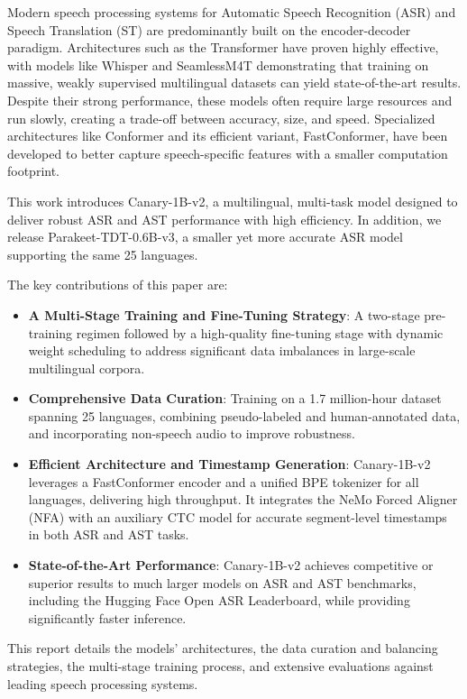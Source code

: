 


Modern speech processing systems for Automatic Speech Recognition (ASR) and Speech Translation (ST) are predominantly built on the encoder-decoder paradigm. Architectures such as the Transformer\cite{attention} have proven highly effective, with models like Whisper\cite{radford2023whisper} and SeamlessM4T\cite{barrault2023seamlessm4t} demonstrating that training on massive, weakly supervised multilingual datasets can yield state-of-the-art results. Despite their strong performance, these models often require large resources and run slowly, creating a trade-off between accuracy, size, and speed. Specialized architectures like Conformer and its efficient variant, FastConformer, have been developed to better capture speech-specific features with a smaller computation footprint.

This work introduces Canary-1B-v2, a multilingual, multi-task model designed to deliver robust ASR and AST performance with high efficiency. In addition, we release Parakeet-TDT-0.6B-v3, a smaller yet more accurate ASR model supporting the same 25 languages.

The key contributions of this paper are:

\begin{itemize}
\item \textbf{A Multi-Stage Training and Fine-Tuning Strategy}: A two-stage pre-training regimen followed by a high-quality fine-tuning stage with dynamic weight scheduling to address significant data imbalances in large-scale multilingual corpora.

\item \textbf{Comprehensive Data Curation}: Training on a 1.7 million-hour dataset spanning 25 languages, combining pseudo-labeled and human-annotated data, and incorporating non-speech audio to improve robustness.

\item \textbf{Efficient Architecture and Timestamp Generation}: Canary-1B-v2 leverages a FastConformer encoder and a unified BPE tokenizer for all languages, delivering high throughput. It integrates the NeMo Forced Aligner (NFA) with an auxiliary CTC model for accurate segment-level timestamps in both ASR and AST tasks.

\item \textbf{State-of-the-Art Performance}: Canary-1B-v2 achieves competitive or superior results to much larger models on ASR and AST benchmarks, including the Hugging Face Open ASR Leaderboard, while providing significantly faster inference.

\end{itemize}

This report details the models’ architectures, the data curation and balancing strategies, the multi-stage training process, and extensive evaluations against leading speech processing systems.


